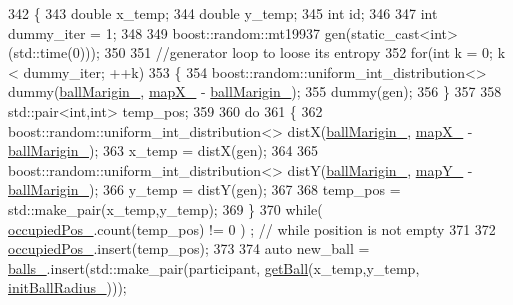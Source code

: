 \begin{DoxyCode}
342     \{
343         \textcolor{keywordtype}{double} x\_temp;
344         \textcolor{keywordtype}{double} y\_temp;
345         \textcolor{keywordtype}{int} id;
346         
347         \textcolor{keywordtype}{int} dummy\_iter = 1;
348         
349         boost::random::mt19937 gen(static\_cast<int>(std::time(0)));
350 
351         \textcolor{comment}{//generator loop to loose its entropy}
352         \textcolor{keywordflow}{for}(\textcolor{keywordtype}{int} k = 0; k < dummy\_iter; ++k)
353         \{
354             boost::random::uniform\_int\_distribution<> dummy(\hyperlink{classwebsocket_1_1GameBoard_add182baa81ccbe72610eebacdb0b8dd6}{ballMarigin\_}, 
      \hyperlink{classwebsocket_1_1GameBoard_a02d0925d31cf26c6853cbb39de6f051c}{mapX\_} - \hyperlink{classwebsocket_1_1GameBoard_add182baa81ccbe72610eebacdb0b8dd6}{ballMarigin\_});
355             dummy(gen);
356         \}
357 
358         std::pair<int,int> temp\_pos;
359 
360         \textcolor{keywordflow}{do}
361         \{
362                 boost::random::uniform\_int\_distribution<> distX(\hyperlink{classwebsocket_1_1GameBoard_add182baa81ccbe72610eebacdb0b8dd6}{ballMarigin\_}, 
      \hyperlink{classwebsocket_1_1GameBoard_a02d0925d31cf26c6853cbb39de6f051c}{mapX\_} - \hyperlink{classwebsocket_1_1GameBoard_add182baa81ccbe72610eebacdb0b8dd6}{ballMarigin\_});
363                 x\_temp = distX(gen);
364                 
365                 boost::random::uniform\_int\_distribution<> distY(\hyperlink{classwebsocket_1_1GameBoard_add182baa81ccbe72610eebacdb0b8dd6}{ballMarigin\_}, 
      \hyperlink{classwebsocket_1_1GameBoard_a60432d0d991c965b75ad2557e9610425}{mapY\_} - \hyperlink{classwebsocket_1_1GameBoard_add182baa81ccbe72610eebacdb0b8dd6}{ballMarigin\_});
366                 y\_temp = distY(gen);
367 
368                 temp\_pos = std::make\_pair(x\_temp,y\_temp);
369         \} 
370         \textcolor{keywordflow}{while}( \hyperlink{classwebsocket_1_1GameBoard_aca1010defacfdd0ea5f032035ce7105e}{occupiedPos\_}.count(temp\_pos) != 0 ) ; \textcolor{comment}{// while position is not empty}
371 
372         \hyperlink{classwebsocket_1_1GameBoard_aca1010defacfdd0ea5f032035ce7105e}{occupiedPos\_}.insert(temp\_pos);
373         
374         \textcolor{keyword}{auto} new\_ball = \hyperlink{classwebsocket_1_1GameBoard_a8bdb65edb9742890aa150d5c7c5b7209}{balls\_}.insert(std::make\_pair(participant, \hyperlink{classwebsocket_1_1GameBoard_ac9ebf0c8fc6a76a60fcc83d60719b161}{getBall}(x\_temp,y\_temp,
      \hyperlink{classwebsocket_1_1GameBoard_a0644b0415ab9a8f4a260e277fca79e1a}{initBallRadius\_})));

\end{DoxyCode}
